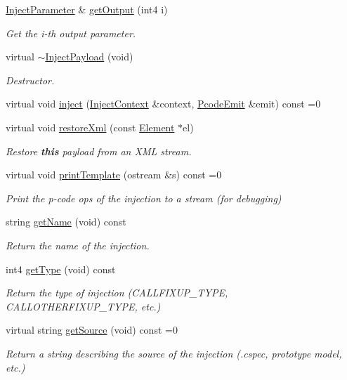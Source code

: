 \begin{DoxyCompactItemize}
\mbox{\hyperlink{class_inject_parameter}{Inject\+Parameter}} \& \mbox{\hyperlink{class_inject_payload_a4d125937d17ce0d4016431b1b3dc5558}{get\+Output}} (int4 i)
\begin{DoxyCompactList}\small\item\em Get the i-\/th output parameter. \end{DoxyCompactList}\item 
virtual \mbox{\hyperlink{class_inject_payload_a01cbbcc5ac7cb4b1c4e08e9403337745}{$\sim$\+Inject\+Payload}} (void)
\begin{DoxyCompactList}\small\item\em Destructor. \end{DoxyCompactList}\item 
virtual void \mbox{\hyperlink{class_inject_payload_aca9c322377f54e8e45c9a79e44ce0ff9}{inject}} (\mbox{\hyperlink{class_inject_context}{Inject\+Context}} \&context, \mbox{\hyperlink{class_pcode_emit}{Pcode\+Emit}} \&emit) const =0
\item 
virtual void \mbox{\hyperlink{class_inject_payload_a19811abba789abc6bc1d3b2322709255}{restore\+Xml}} (const \mbox{\hyperlink{class_element}{Element}} $\ast$el)
\begin{DoxyCompactList}\small\item\em Restore {\bfseries{this}} payload from an X\+ML stream. \end{DoxyCompactList}\item 
virtual void \mbox{\hyperlink{class_inject_payload_ad62729e96e57402de0917f2ff07477c2}{print\+Template}} (ostream \&s) const =0
\begin{DoxyCompactList}\small\item\em Print the p-\/code ops of the injection to a stream (for debugging) \end{DoxyCompactList}\item 
string \mbox{\hyperlink{class_inject_payload_a79f43ab6aabb0ffc2800d500a975ff19}{get\+Name}} (void) const
\begin{DoxyCompactList}\small\item\em Return the name of the injection. \end{DoxyCompactList}\item 
int4 \mbox{\hyperlink{class_inject_payload_af79c55beb971c8ce0a9f0740ca33503e}{get\+Type}} (void) const
\begin{DoxyCompactList}\small\item\em Return the type of injection (C\+A\+L\+L\+F\+I\+X\+U\+P\+\_\+\+T\+Y\+PE, C\+A\+L\+L\+O\+T\+H\+E\+R\+F\+I\+X\+U\+P\+\_\+\+T\+Y\+PE, etc.) \end{DoxyCompactList}\item 
virtual string \mbox{\hyperlink{class_inject_payload_aee01fa71c361b38625bdc15badaee7bc}{get\+Source}} (void) const =0
\begin{DoxyCompactList}\small\item\em Return a string describing the {\itshape source} of the injection (.cspec, prototype model, etc.) \end{DoxyCompactList}\end{DoxyCompactItemize}
